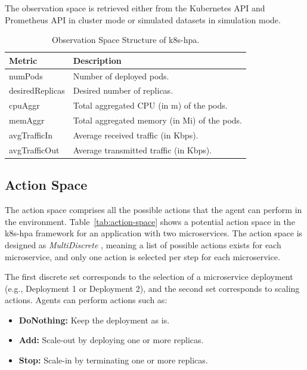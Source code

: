 \documentclass[conference]{IEEEtran}
\begin{document}
The observation space is retrieved either from the Kubernetes API and Prometheus API in cluster mode or simulated datasets in simulation mode.

\begin{table}[h]
    \centering
    \caption{Observation Space Structure of k8s-hpa.}
    \label{tab:observation-space}
    \begin{tabular}{|l|l|}
        \hline
        \textbf{Metric} & \textbf{Description} \\
        \hline
        numPods & Number of deployed pods. \\
        desiredReplicas & Desired number of replicas. \\
        cpuAggr & Total aggregated CPU (in m) of the pods. \\
        memAggr & Total aggregated memory (in Mi) of the pods. \\
        avgTrafficIn & Average received traffic (in Kbps). \\
        avgTrafficOut & Average transmitted traffic (in Kbps). \\
        \hline
    \end{tabular}
\end{table}

\subsection{Action Space}

The action space comprises all the possible actions that the agent can perform in the environment. Table~\ref{tab:action-space} shows a potential action space in the k8s-hpa framework for an application with two microservices. The action space is designed as \textit{MultiDiscrete} \cite{openAIGym}, meaning a list of possible actions exists for each microservice, and only one action is selected per step for each microservice.

The first discrete set corresponds to the selection of a microservice deployment (e.g., Deployment 1 or Deployment 2), and the second set corresponds to scaling actions. Agents can perform actions such as:
\begin{itemize}
    \item \textbf{DoNothing:} Keep the deployment as is.
    \item \textbf{Add:} Scale-out by deploying one or more replicas.
    \item \textbf{Stop:} Scale-in by terminating one or more replicas.
\end{itemize}
\end{document}
